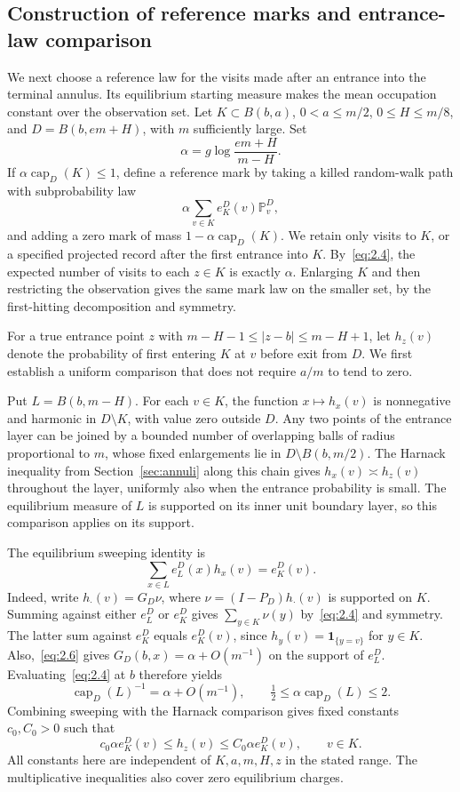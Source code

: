\documentclass[11pt,a4paper]{article}
\numberwithin{equation}{section}
\theoremstyle{remark}
\begin{document}
\subsection{Construction of reference marks and entrance-law comparison}\label{sec:marks}
We next choose a reference law for the visits made after an entrance into the terminal annulus. Its equilibrium starting measure makes the mean occupation constant over the observation set. Let $K\subset B(b,a)$, $0<a\le m/2$, $0\le H\le m/8$, and $D=B(b,em+H)$, with $m$ sufficiently large. Set
\[
\alpha=g\log\frac{em+H}{m-H}.
\]
If $\alpha\operatorname{cap}_D(K)\le1$, define a reference mark by taking a killed random-walk path with subprobability law
\begin{equation}\label{eq:2.14}
\alpha\sum_{v\in K}e_K^D(v)\mathbb P_v^D,
\end{equation}
and adding a zero mark of mass $1-\alpha\operatorname{cap}_D(K)$. We retain only visits to $K$, or a specified projected record after the first entrance into $K$. By~\eqref{eq:2.4}, the expected number of visits to each $z\in K$ is exactly $\alpha$. Enlarging $K$ and then restricting the observation gives the same mark law on the smaller set, by the first-hitting decomposition and symmetry.

For a true entrance point $z$ with $m-H-1\le|z-b|\le m-H+1$, let $h_z(v)$ denote the probability of first entering $K$ at $v$ before exit from $D$. We first establish a uniform comparison that does not require $a/m$ to tend to zero.

Put $L=B(b,m-H)$. For each $v\in K$, the function $x\mapsto h_x(v)$ is nonnegative and harmonic in $D\setminus K$, with value zero outside $D$. Any two points of the entrance layer can be joined by a bounded number of overlapping balls of radius proportional to $m$, whose fixed enlargements lie in $D\setminus B(b,m/2)$. The Harnack inequality from Section~\ref{sec:annuli} along this chain gives $h_x(v)\asymp h_z(v)$ throughout the layer, uniformly also when the entrance probability is small. The equilibrium measure of $L$ is supported on its inner unit boundary layer, so this comparison applies on its support.

The equilibrium sweeping identity is
\[
\sum_{x\in L}e_L^D(x)h_x(v)=e_K^D(v).
\]
Indeed, write $h_\cdot(v)=G_D\nu$, where $\nu=(I-P_D)h_\cdot(v)$ is supported on $K$. Summing against either $e_L^D$ or $e_K^D$ gives $\sum_{y\in K}\nu(y)$ by~\eqref{eq:2.4} and symmetry. The latter sum against $e_K^D$ equals $e_K^D(v)$, since $h_y(v)=\mathbf1_{\{y=v\}}$ for $y\in K$.
Also,~\eqref{eq:2.6} gives $G_D(b,x)=\alpha+O(m^{-1})$ on the support of $e_L^D$. Evaluating~\eqref{eq:2.4} at $b$ therefore yields
\[
\operatorname{cap}_D(L)^{-1}=\alpha+O(m^{-1}),\qquad
\tfrac12\le\alpha\operatorname{cap}_D(L)\le2.
\]
Combining sweeping with the Harnack comparison gives fixed constants $c_0,C_0>0$ such that
\[
c_0\alpha e_K^D(v)\le h_z(v)\le C_0\alpha e_K^D(v),
\qquad v\in K.
\]
All constants here are independent of $K,a,m,H,z$ in the stated range. The multiplicative inequalities also cover zero equilibrium charges.
\end{document}
